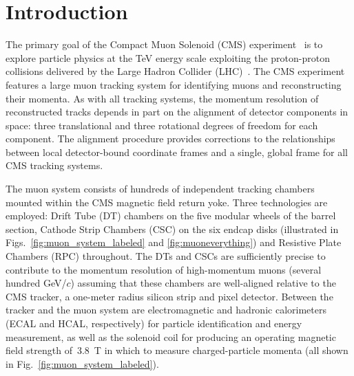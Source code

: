 \documentclass[11pt,twoside,a4paper,cmspaper]{cms-tdr}
\begin{document}

\maketitle %


\section{Introduction}

The primary goal of the Compact Muon Solenoid (CMS)
experiment~\cite{:2008zzk} is to explore particle physics at the TeV
energy scale exploiting the proton-proton collisions delivered by the
Large Hadron Collider (LHC)~\cite{Evans:2008zzb}.  The CMS experiment
features a large muon tracking system for identifying muons and
reconstructing their momenta.  As with all tracking systems, the
momentum resolution of reconstructed tracks depends in part on the
alignment of detector components in space: three translational and
three rotational degrees of freedom for each component.  The alignment
procedure provides corrections to the relationships between local
detector-bound coordinate frames and a single, global frame for all
CMS tracking systems.

The muon system consists of hundreds of independent tracking chambers
mounted within the CMS magnetic field return yoke.  Three technologies
are employed: Drift Tube (DT) chambers on the five modular wheels of
the barrel section, Cathode
Strip Chambers (CSC) on the six endcap disks (illustrated in
Figs.~\ref{fig:muon_system_labeled} and \ref{fig:muoneverything}) and
Resistive Plate Chambers (RPC) throughout.  The DTs and CSCs are
sufficiently precise to contribute to the momentum resolution of
high-momentum muons (several hundred GeV/$c$) assuming that these
chambers are well-aligned relative to the CMS tracker, a one-meter
radius silicon strip and pixel detector.  Between the tracker and the
muon system are electromagnetic and hadronic calorimeters (ECAL and
HCAL, respectively) for particle identification and energy
measurement, as well as the solenoid coil for producing an operating
magnetic field strength of~3.8~T in which to measure charged-particle
momenta (all shown in Fig.~\ref{fig:muon_system_labeled}).
\end{document}
